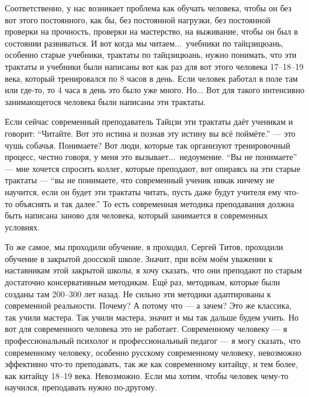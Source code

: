 Соответственно, у нас возникает проблема как 
обучать человека, чтобы он без вот этого постоянного, 
как бы, без постоянной нагрузки, без постоянной 
проверки на прочность, проверки на мастерство, на 
выживание, чтобы он был в состоянии развиваться.  И вот 
когда мы читаем...\ учебники по тайцзицюань, особенно 
старые учебники, трактаты по тайцзицюань, нужно 
понимать, что эти трактаты и учебники были написаны 
вот как раз для вот этого человека 17--18--19 века, который 
тренировался по 8 часов в день. Если человек 
работал в поле там или где-то, то 4 часа в день это было 
уже много.
Но... Вот для такого интенсивно 
занимающегося человека были написаны эти трактаты. 

Если сейчас современный преподаватель Тайцзи эти 
трактаты даёт ученикам и говорит: ``Читайте. Вот это 
истина и познав эту истину вы всё поймёте.'' --- это чушь 
собачья. Понимаете? Вот люди, которые так организуют 
тренировочный процесс, честно говоря, у меня это 
вызывает...\ недоумение. ``Вы не понимаете'' ---  мне хочется 
спросить коллег, которые преподают, вот опираясь на 
эти старые трактаты --- ``вы не понимаете, что современный 
ученик никак ничему не научится, если он будет эти 
трактаты читать, пусть даже будут учителя ему что-то 
объяснять и так далее.'' То есть современная методика 
преподавания должна быть написана заново для 
человека, который занимается в современных условиях. 

То же самое, мы проходили обучение, я проходил, Сергей 
Титов, проходили обучение в закрытой доосской школе. 
Значит, при всём моём уважении к наставникам этой 
закрытой школы, я хочу сказать, что они преподают по 
старым достаточно консервативным методикам. Ещё раз, 
методикам, которые были созданы там 200--300 лет назад. Не 
сильно эти методики адаптированы к современной 
реальности. Почему? А потому что --- а зачем?  Это же 
классика, так учили мастера.  Так учили мастера, 
значит и мы так дальше будем учить. Но вот для 
современного человека это не работает. Современному 
человеку --- я профессиональный психолог и 
профессиональный педагог --- я могу сказать, что 
современному человеку, особенно русскому 
современному человеку, невозможно эффективно что-то 
преподавать, так же как современному китайцу, и тем 
более, как китайцу 18--19 века. Невозможно. Если мы хотим, 
чтобы человек чему-то научился, преподавать нужно 
по-другому.

